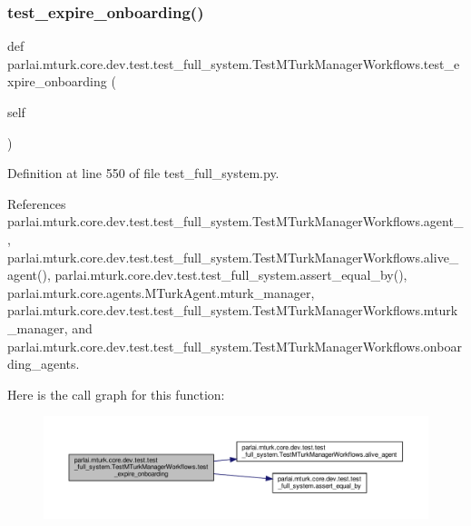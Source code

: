 \subsubsection{\texorpdfstring{test\+\_\+expire\+\_\+onboarding()}{test\_expire\_onboarding()}}
{\footnotesize\ttfamily def parlai.\+mturk.\+core.\+dev.\+test.\+test\+\_\+full\+\_\+system.\+Test\+M\+Turk\+Manager\+Workflows.\+test\+\_\+expire\+\_\+onboarding (\begin{DoxyParamCaption}\item[{}]{self }\end{DoxyParamCaption})}



Definition at line 550 of file test\+\_\+full\+\_\+system.\+py.



References parlai.\+mturk.\+core.\+dev.\+test.\+test\+\_\+full\+\_\+system.\+Test\+M\+Turk\+Manager\+Workflows.\+agent\+\_, parlai.\+mturk.\+core.\+dev.\+test.\+test\+\_\+full\+\_\+system.\+Test\+M\+Turk\+Manager\+Workflows.\+alive\+\_\+agent(), parlai.\+mturk.\+core.\+dev.\+test.\+test\+\_\+full\+\_\+system.\+assert\+\_\+equal\+\_\+by(), parlai.\+mturk.\+core.\+agents.\+M\+Turk\+Agent.\+mturk\+\_\+manager, parlai.\+mturk.\+core.\+dev.\+test.\+test\+\_\+full\+\_\+system.\+Test\+M\+Turk\+Manager\+Workflows.\+mturk\+\_\+manager, and parlai.\+mturk.\+core.\+dev.\+test.\+test\+\_\+full\+\_\+system.\+Test\+M\+Turk\+Manager\+Workflows.\+onboarding\+\_\+agents.

Here is the call graph for this function\+:
\nopagebreak
\begin{figure}[H]
\begin{center}
\leavevmode
\includegraphics[width=350pt]{classparlai_1_1mturk_1_1core_1_1dev_1_1test_1_1test__full__system_1_1TestMTurkManagerWorkflows_ad1c8b65395e4d230f2289a0c95da5da0_cgraph}
\end{center}
\end{figure}
\mbox{\label{classparlai_1_1mturk_1_1core_1_1dev_1_1test_1_1test__full__system_1_1TestMTurkManagerWorkflows_aea7f86b35f032a0f71f92b6e1a207a61}} 
